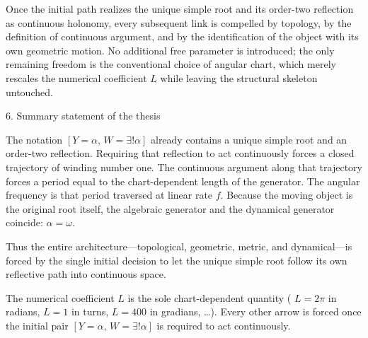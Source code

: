 Once the initial path realizes the unique simple root and its order-two reflection as continuous holonomy, every subsequent link is compelled by topology, by the definition of continuous argument, and by the identification of the object with its own geometric motion. No additional free parameter is introduced; the only remaining freedom is the conventional choice of angular chart, which merely rescales the numerical coefficient \(L\) while leaving the structural skeleton untouched.

6. Summary statement of the thesis

The notation \([Y=\alpha,\,W=\exists!\alpha]\) already contains a unique simple root and an order-two reflection. Requiring that reflection to act continuously forces a closed trajectory of winding number one. The continuous argument along that trajectory forces a period equal to the chart-dependent length of the generator. The angular frequency is that period traversed at linear rate \(f\). Because the moving object is the original root itself, the algebraic generator and the dynamical generator coincide: \(\alpha=\omega\).  

Thus the entire architecture—topological, geometric, metric, and dynamical—is forced by the single initial decision to let the unique simple root follow its own reflective path into continuous space.

The numerical coefficient \(L\) is the sole chart-dependent quantity ( \(L=2\pi\) in radians, \(L=1\) in turns, \(L=400\) in gradians, \ldots). Every other arrow is forced once the initial pair \([Y=\alpha,\,W=\exists!\alpha]\) is required to act continuously.
